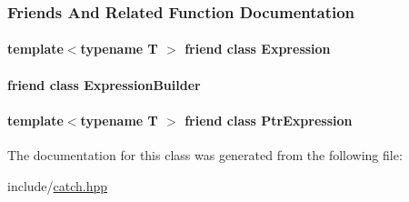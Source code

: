 \subsubsection{Friends And Related Function Documentation}
\hypertarget{classCatch_1_1ResultInfoBuilder_afda064da5c8339135d205a860b149338}{
\paragraph[{Expression}]{\setlength{\rightskip}{0pt plus 5cm}template$<$typename T $>$ friend class {\bf Expression}\hspace{0.3cm}{\ttfamily [friend]}}}\label{classCatch_1_1ResultInfoBuilder_afda064da5c8339135d205a860b149338}
\hypertarget{classCatch_1_1ResultInfoBuilder_a1912ceb0cba0cbbf0291b374a84f0608}{
\paragraph[{Expression\-Builder}]{\setlength{\rightskip}{0pt plus 5cm}friend class {\bf Expression\-Builder}\hspace{0.3cm}{\ttfamily [friend]}}}\label{classCatch_1_1ResultInfoBuilder_a1912ceb0cba0cbbf0291b374a84f0608}
\hypertarget{classCatch_1_1ResultInfoBuilder_a26079e28b8ef20b8a53337a19d519904}{
\paragraph[{Ptr\-Expression}]{\setlength{\rightskip}{0pt plus 5cm}template$<$typename T $>$ friend class Ptr\-Expression\hspace{0.3cm}{\ttfamily [friend]}}}\label{classCatch_1_1ResultInfoBuilder_a26079e28b8ef20b8a53337a19d519904}


The documentation for this class was generated from the following file\-:\begin{DoxyCompactItemize}
\item 
include/\hyperlink{catch_8hpp}{catch.\-hpp}\end{DoxyCompactItemize}
